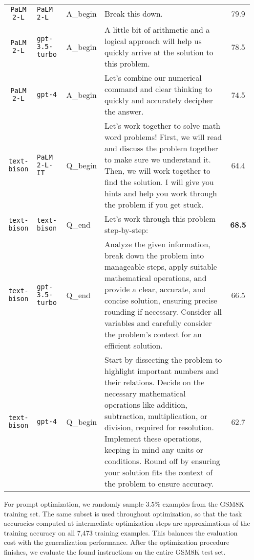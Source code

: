 \begin{table}[t]
\begin{center}
{\begin{tabular}{cP{2cm}P{1.5cm}P{8cm}c}
\texttt{PaLM 2-L} & \texttt{PaLM 2-L} & A\_begin & Break this down. & 79.9 \\ [1ex]
\texttt{PaLM 2-L} & \texttt{gpt-3.5-turbo} & A\_begin & A little bit of arithmetic and a logical approach will help us quickly arrive at the solution to this problem. & 78.5 \\ [3ex]
\texttt{PaLM 2-L} & \texttt{gpt-4} & A\_begin & Let's combine our numerical command and clear thinking to quickly and accurately decipher the answer. & 74.5 \\ [3ex]
\texttt{text-bison} & \texttt{PaLM 2-L-IT} & Q\_begin & Let's work together to solve math word problems! First, we will read and discuss the problem together to make sure we understand it. Then, we will work together to find the solution. I will give you hints and help you work through the problem if you get stuck. & 64.4 \\ [3ex]
\texttt{text-bison} & \texttt{text-bison} & Q\_end & Let's work through this problem step-by-step: & \textbf{68.5} \\ [1ex]
\texttt{text-bison} & \texttt{gpt-3.5-turbo} & Q\_end & Analyze the given information, break down the problem into manageable steps, apply suitable mathematical operations, and provide a clear, accurate, and concise solution, ensuring precise rounding if necessary. Consider all variables and carefully consider the problem's context for an efficient solution. & 66.5 \\ [5ex]
\texttt{text-bison} & \texttt{gpt-4} & Q\_begin & Start by dissecting the problem to highlight important numbers and their relations. Decide on the necessary mathematical operations like addition, subtraction, multiplication, or division, required for resolution. Implement these operations, keeping in mind any units or conditions. Round off by ensuring your solution fits the context of the problem to ensure accuracy. & 62.7 \\
\bottomrule
\end{tabular}}
\end{center}
\label{table:top_instructions_on_gsm8k}
\end{table}

For prompt optimization, we randomly sample 3.5\% examples from the GSM8K training set.
The same subset is used throughout optimization, so that the task accuracies computed at intermediate optimization steps are approximations of the training accuracy on all 7,473 training examples.
This balances the evaluation cost with the generalization performance.
After the optimization procedure finishes, we evaluate the found instructions on the entire GSM8K test set.

